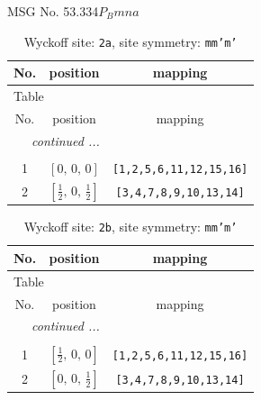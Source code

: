 \documentclass[fleqn,8pt]{jsarticle}
\begin{document}
\setcounter{MaxMatrixCols}{32}

\renewcommand{\tablename}{Table~}
\renewcommand{\figurename}{Figure~}
\begin{center}
\LARGE
MSG No. 53.334\quad$P_{B}mna$
\end{center}
\renewcommand{\arraystretch}{1.2}
\begin{longtable}{ccc}
\caption{Wyckoff site: {\tt 2a}, site symmetry: {\tt mm'm'}}
 \\
 \hline \hline
No. & position & mapping \\ \hline \endfirsthead

\multicolumn{2}{l}{\tablename\ \thetable{}} \\
 \hline \hline
No. & position & mapping \\ \hline \endhead

 \hline \hline
\multicolumn{2}{r}{\footnotesize\it continued ...} \\ \endfoot

 \hline \hline
\multicolumn{2}{r}{} \\ \endlastfoot

1 & $\left[ 0,\, 0,\, 0 \right]$ & {\tt [1,2,5,6,11,12,15,16]} \\ \hline
2 & $\left[ \frac{1}{2},\, 0,\, \frac{1}{2} \right]$ & {\tt [3,4,7,8,9,10,13,14]} \\
\end{longtable}
\renewcommand{\arraystretch}{1.2}
\begin{longtable}{ccc}
\caption{Wyckoff site: {\tt 2b}, site symmetry: {\tt mm'm'}}
 \\
 \hline \hline
No. & position & mapping \\ \hline \endfirsthead

\multicolumn{2}{l}{\tablename\ \thetable{}} \\
 \hline \hline
No. & position & mapping \\ \hline \endhead

 \hline \hline
\multicolumn{2}{r}{\footnotesize\it continued ...} \\ \endfoot

 \hline \hline
\multicolumn{2}{r}{} \\ \endlastfoot

1 & $\left[ \frac{1}{2},\, 0,\, 0 \right]$ & {\tt [1,2,5,6,11,12,15,16]} \\ \hline
2 & $\left[ 0,\, 0,\, \frac{1}{2} \right]$ & {\tt [3,4,7,8,9,10,13,14]} \\
\end{longtable}
\end{document}

